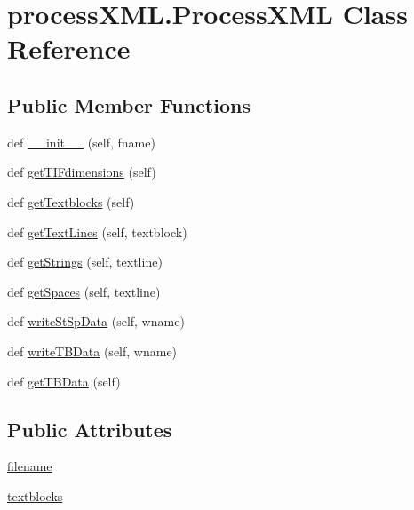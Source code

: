 \hypertarget{classprocess_x_m_l_1_1_process_x_m_l}{}\section{process\+X\+M\+L.\+Process\+X\+M\+L Class Reference}
\label{classprocess_x_m_l_1_1_process_x_m_l}
\subsection*{Public Member Functions}
\begin{DoxyCompactItemize}
\item 
def \hyperlink{classprocess_x_m_l_1_1_process_x_m_l_a239cf7e56b75401207c27aa97042264c}{\+\_\+\+\_\+init\+\_\+\+\_\+} (self, fname)
\item 
def \hyperlink{classprocess_x_m_l_1_1_process_x_m_l_acf05a18faa82bfd054095224cabecf09}{get\+T\+I\+Fdimensions} (self)
\item 
def \hyperlink{classprocess_x_m_l_1_1_process_x_m_l_ad8d8b88d0633c29239604efa99ff9504}{get\+Textblocks} (self)
\item 
def \hyperlink{classprocess_x_m_l_1_1_process_x_m_l_ac6ddf3d3b2c45198191bc4bf627fef24}{get\+Text\+Lines} (self, textblock)
\item 
def \hyperlink{classprocess_x_m_l_1_1_process_x_m_l_a7265a97d3b9e0dabdd853480dffbfc99}{get\+Strings} (self, textline)
\item 
def \hyperlink{classprocess_x_m_l_1_1_process_x_m_l_a532a84a9228cc199a44b86c07b9ed10c}{get\+Spaces} (self, textline)
\item 
def \hyperlink{classprocess_x_m_l_1_1_process_x_m_l_a714f8e399081a707b4bc8d69b016bd32}{write\+St\+Sp\+Data} (self, wname)
\item 
def \hyperlink{classprocess_x_m_l_1_1_process_x_m_l_a539513378d3177048e6959870a9abf1d}{write\+T\+B\+Data} (self, wname)
\item 
def \hyperlink{classprocess_x_m_l_1_1_process_x_m_l_afa79739715bdd28a1f6d26fcf3496e4a}{get\+T\+B\+Data} (self)
\end{DoxyCompactItemize}
\subsection*{Public Attributes}
\begin{DoxyCompactItemize}
\item 
\hyperlink{classprocess_x_m_l_1_1_process_x_m_l_ad0d4a751eec2b798152a7908ef84154d}{filename}
\item 
\hyperlink{classprocess_x_m_l_1_1_process_x_m_l_aef1a420c84937ecbe7eb76e5c99445f8}{textblocks}
\end{DoxyCompactItemize}


